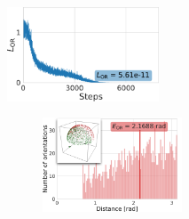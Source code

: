 \begin{figure}[ht!]
    \begin{minipage}[t]{0.33\linewidth}
        \centering
        \includegraphics[height=2.8cm]{figures/5a1a_quartercov_uniformS2_perfect_ar_aa}
        \caption{%
            Example of perfect orientation recovery (for \texttt{5a1a}).
            The loss $L_\text{OR}$  converges to zero when the distance estimation is perfect, \ie, $\widehat{d_p}(\p_i, \p_j) = d_q(q_i, q_j)$.
        }\label{fig:5j0n-orientation-recovery-loss}
    \end{minipage}
    \hfill
    \begin{minipage}[t]{0.64\linewidth}
        \begin{subfigure}[t]{0.49\linewidth}
            \centering
            \includegraphics[height=2.8cm]{figures/BeforeAA.pdf}

\end{subfigure}
\end{minipage}
\end{figure}
